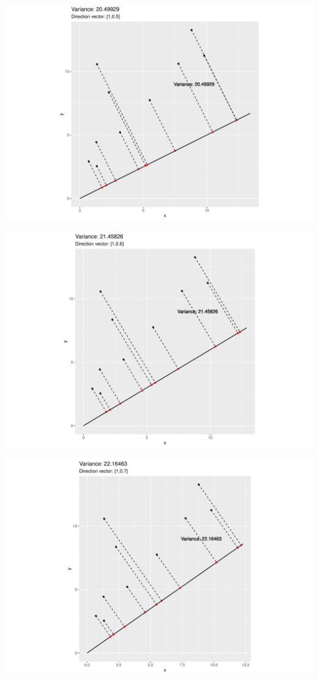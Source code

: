 \documentclass[
  ignorenonframetext,
]{beamer}
\begin{document}
\begin{frame}{}
\protect\hypertarget{section-5}{}
\includegraphics{note9_files/figure-beamer/unnamed-chunk-12-1.pdf}
\end{frame}

\begin{frame}{}
\protect\hypertarget{section-6}{}
\includegraphics{note9_files/figure-beamer/unnamed-chunk-13-1.pdf}
\end{frame}

\begin{frame}{}
\protect\hypertarget{section-7}{}
\includegraphics{note9_files/figure-beamer/unnamed-chunk-14-1.pdf}
\end{frame}
\end{document}

